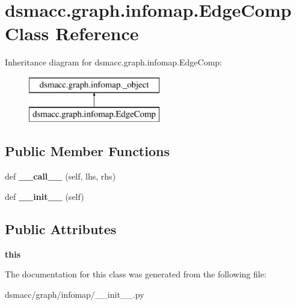 \hypertarget{classdsmacc_1_1graph_1_1infomap_1_1EdgeComp}{}\section{dsmacc.\+graph.\+infomap.\+Edge\+Comp Class Reference}
\label{classdsmacc_1_1graph_1_1infomap_1_1EdgeComp}
Inheritance diagram for dsmacc.\+graph.\+infomap.\+Edge\+Comp\+:\begin{figure}[H]
\begin{center}
\leavevmode
\includegraphics[height=2.000000cm]{classdsmacc_1_1graph_1_1infomap_1_1EdgeComp}
\end{center}
\end{figure}
\subsection*{Public Member Functions}
\begin{DoxyCompactItemize}
\item 
\mbox{\label{classdsmacc_1_1graph_1_1infomap_1_1EdgeComp_acff3865ff50e14705cb1ff7b1f61d43e}} 
def {\bfseries \+\_\+\+\_\+call\+\_\+\+\_\+} (self, lhs, rhs)
\item 
\mbox{\label{classdsmacc_1_1graph_1_1infomap_1_1EdgeComp_a906052cbe721f16f0f7c701b338ccae7}} 
def {\bfseries \+\_\+\+\_\+init\+\_\+\+\_\+} (self)
\end{DoxyCompactItemize}
\subsection*{Public Attributes}
\begin{DoxyCompactItemize}
\item 
\mbox{\label{classdsmacc_1_1graph_1_1infomap_1_1EdgeComp_aca34e557a06800d493b310a9c43e4ae8}} 
{\bfseries this}
\end{DoxyCompactItemize}


The documentation for this class was generated from the following file\+:\begin{DoxyCompactItemize}
\item 
dsmacc/graph/infomap/\+\_\+\+\_\+init\+\_\+\+\_\+.\+py\end{DoxyCompactItemize}

